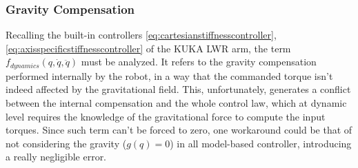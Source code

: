 \subsubsection{Gravity Compensation}
Recalling the built-in controllers \eqref{eq:cartesianstiffnesscontroller},\eqref{eq:axisspecificstiffnesscontroller} of the KUKA LWR arm, the term $f_{dynamics}(q,\dot{q},\ddot{q})$ must be analyzed. It refers to the gravity compensation performed internally by the robot, in a way that the commanded torque isn't indeed affected by the gravitational field. This, unfortunately, generates a conflict between the internal compensation and the whole control law, which at dynamic level requires the knowledge of the gravitational force to compute the input torques. Since such term can't be forced to zero, one workaround could be that of not considering the gravity ($g(q)=0$) in all model-based controller, introducing a really negligible error.
\newpage
